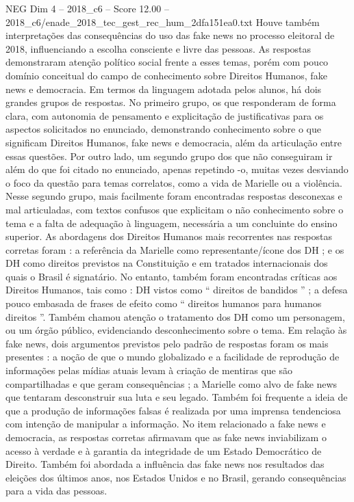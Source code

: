 \begin{textsample}{NEG Dim 4 – 2018\_c6 – Score 12.00 – 2018\_c6/enade\_2018\_tec\_gest\_rec\_hum\_2dfa151ea0.txt}
Houve também interpretações das consequências do uso das fake news no processo eleitoral de 2018, influenciando a escolha consciente e livre das pessoas.
As respostas demonstraram atenção político social frente a esses temas, porém com pouco domínio conceitual do campo de conhecimento sobre Direitos Humanos, fake news e democracia.
Em termos da linguagem adotada pelos alunos, há dois grandes grupos de respostas.
No primeiro grupo, os que responderam de forma clara, com autonomia de pensamento e explicitação de justificativas para os aspectos solicitados no enunciado, demonstrando conhecimento sobre o que significam Direitos Humanos, fake news e democracia, além da articulação entre essas questões.
Por outro lado, um segundo grupo dos que não conseguiram ir além do que foi citado no enunciado, apenas repetindo -o, muitas vezes desviando o foco da questão para temas correlatos, como a vida de Marielle ou a violência.
Nesse segundo grupo, mais facilmente foram encontradas respostas desconexas e mal articuladas, com textos confusos que explicitam o não conhecimento sobre o tema e a falta de adequação à linguagem, necessária a um concluinte do ensino superior.
As abordagens dos Direitos Humanos mais recorrentes nas respostas corretas foram : a referência da Marielle como representante/ícone dos DH ; e os DH como direitos previstos na Constituição e em tratados internacionais dos quais o Brasil é signatário.
No entanto, também foram encontradas críticas aos Direitos Humanos, tais como : DH vistos como “ direitos de bandidos ” ; a defesa pouco embasada de frases de efeito como “ direitos humanos para humanos direitos ”.
Também chamou atenção o tratamento dos DH como um personagem, ou um órgão público, evidenciando desconhecimento sobre o tema.
Em relação às fake news, dois argumentos previstos pelo padrão de respostas foram os mais presentes : a noção de que o mundo globalizado e a facilidade de reprodução de informações pelas mídias atuais levam à criação de mentiras que são compartilhadas e que geram consequências ; a Marielle como alvo de fake news que tentaram desconstruir sua luta e seu legado.
Também foi frequente a ideia de que a produção de informações falsas é realizada por uma imprensa tendenciosa com intenção de manipular a informação.
No item relacionado a fake news e democracia, as respostas corretas afirmavam que as fake news inviabilizam o acesso à verdade e à garantia da integridade de um Estado Democrático de Direito.
Também foi abordada a influência das fake news nos resultados das eleições dos últimos anos, nos Estados Unidos e no Brasil, gerando consequências para a vida das pessoas.

\end{textsample}
